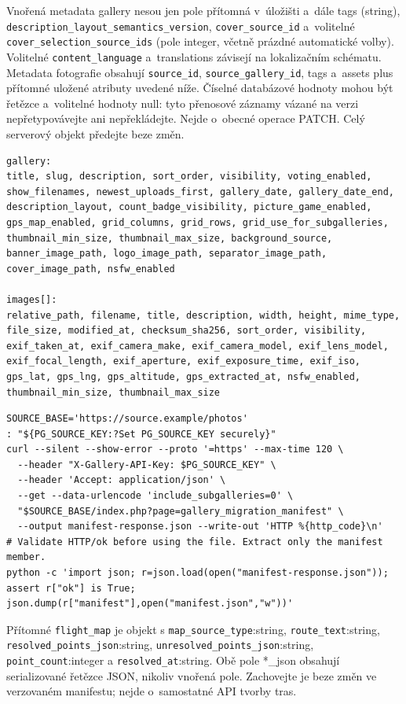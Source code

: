 \documentclass[11pt,a4paper]{article}
\newcommand{\codeword}[1]{\nolinkurl{#1}}
\begin{document}
Vnořená metadata gallery nesou jen pole přítomná v~úložišti a~dále tags (string),
\codeword{description_layout_semantics_version}, \codeword{cover_source_id} a~volitelné
\codeword{cover_selection_source_ids} (pole integer, včetně prázdné automatické volby).
Volitelné \codeword{content_language} a~translations závisejí na lokalizačním schématu.
Metadata fotografie obsahují \codeword{source_id}, \codeword{source_gallery_id}, tags
a~assets plus přítomné uložené atributy uvedené níže. Číselné databázové hodnoty mohou být
řetězce a~volitelné hodnoty null: tyto přenosové záznamy vázané na verzi nepřetypovávejte
ani nepřekládejte. Nejde o~obecné operace PATCH. Celý serverový objekt předejte beze změn.

\begin{lstlisting}[language={}]
gallery:
title, slug, description, sort_order, visibility, voting_enabled,
show_filenames, newest_uploads_first, gallery_date, gallery_date_end,
description_layout, count_badge_visibility, picture_game_enabled,
gps_map_enabled, grid_columns, grid_rows, grid_use_for_subgalleries,
thumbnail_min_size, thumbnail_max_size, background_source,
banner_image_path, logo_image_path, separator_image_path,
cover_image_path, nsfw_enabled

images[]:
relative_path, filename, title, description, width, height, mime_type,
file_size, modified_at, checksum_sha256, sort_order, visibility,
exif_taken_at, exif_camera_make, exif_camera_model, exif_lens_model,
exif_focal_length, exif_aperture, exif_exposure_time, exif_iso,
gps_lat, gps_lng, gps_altitude, gps_extracted_at, nsfw_enabled,
thumbnail_min_size, thumbnail_max_size
\end{lstlisting}

\begin{lstlisting}[language={}]
SOURCE_BASE='https://source.example/photos'
: "${PG_SOURCE_KEY:?Set PG_SOURCE_KEY securely}"
curl --silent --show-error --proto '=https' --max-time 120 \
  --header "X-Gallery-API-Key: $PG_SOURCE_KEY" \
  --header 'Accept: application/json' \
  --get --data-urlencode 'include_subgalleries=0' \
  "$SOURCE_BASE/index.php?page=gallery_migration_manifest" \
  --output manifest-response.json --write-out 'HTTP %{http_code}\n'
# Validate HTTP/ok before using the file. Extract only the manifest member.
python -c 'import json; r=json.load(open("manifest-response.json")); assert r["ok"] is True; json.dump(r["manifest"],open("manifest.json","w"))'
\end{lstlisting}

Přítomné \codeword{flight_map} je objekt s \codeword{map_source_type}:string,
\codeword{route_text}:string, \codeword{resolved_points_json}:string,
\codeword{unresolved_points_json}:string, \codeword{point_count}:integer a
\codeword{resolved_at}:string. Obě pole *\_json obsahují serializované řetězce JSON, nikoliv
vnořená pole. Zachovejte je beze změn ve verzovaném manifestu; nejde o~samostatné API tvorby
tras.
\end{document}
